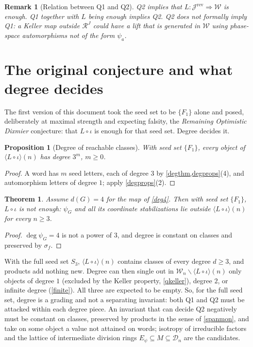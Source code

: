 \documentclass[11pt]{article}
\theoremstyle{change}
\newtheorem{theorem}[equation]{Theorem}
\newtheorem{prop}[equation]{Proposition}
\newtheorem{remark}[equation]{Remark}
\theoremstyle{nonumberplain}
\newtheorem{proof}{Proof}
\newcommand\cJ{{\mathcal J}}
\newcommand\cW{{\mathcal W}}
\newcommand\cR{{\mathcal R}}
\newcommand\cD{{\mathcal D}}
\newcommand\sminus{\smallsetminus}
\newcommand\setof[1]{\{ #1 \}}
\newcommand\rev{{\mathrm{rev}}}
\begin{document}
\begin{remark}[Relation between Q1 and Q2]
Q2 implies that $L : \cJ^\rev \Rightarrow \cW$ is enough. Q1 together with $L$ being enough implies Q2. Q2 does not formally imply Q1: a Keller map outside $\cR^J$ could have a lift that is generated in $\cW$ using phase-space automorphisms not of the form $\psi_a$.
\end{remark}

\section{The original conjecture and what degree decides\label{ROD}}

The first version of this document took the seed set to be $\setof{F_1}$ alone and posed, deliberately at maximal strength and expecting falsity, the \emph{Remaining Optimistic Dixmier} conjecture: that $L\circ\iota$ is enough for that seed set. Degree decides it.

\begin{prop}[Degree of reachable classes]
With seed set $\setof{F_1}$, every object of $\langle L \circ \iota \rangle(n)$ has degree $3^m$, $m \geq 0$.
\end{prop}

\begin{proof}
A word has $m$ seed letters, each of degree $3$ by \cref{degthm,degprops}(4), and automorphism letters of degree $1$; apply \cref{degprops}(2).
\end{proof}

\begin{theorem}
Assume $d(G) = 4$ for the map of \cref{deg4}. Then with seed set $\setof{F_1}$, $L\circ\iota$ is not enough: $\psi_G$ and all its coordinate stabilizations lie outside $\langle L\circ\iota \rangle(n)$ for every $n \geq 3$.
\end{theorem}

\begin{proof}
$\deg \psi_G = 4$ is not a power of $3$, and degree is constant on classes and preserved by $\sigma_f$.
\end{proof}

With the full seed set $S_3$, $\langle L\circ\iota\rangle(n)$ contains classes of every degree $d \geq 3$, and products add nothing new. Degree can then single out in $\cW_n \sminus \langle L\circ\iota\rangle(n)$ only objects of degree $1$ (excluded by the Keller property, \cref{qkeller}), degree $2$, or infinite degree (\cref{finite}). All three are expected to be empty. So, for the full seed set, degree is a grading and not a separating invariant: both Q1 and Q2 must be attacked within each degree piece. An invariant that can decide Q2 negatively must be constant on classes, preserved by products in the sense of \cref{spanmon}, and take on some object a value not attained on words; isotropy of irreducible factors and the lattice of intermediate division rings $E_\psi \subseteq M \subseteq \cD_n$ are the candidates.
\end{document}
